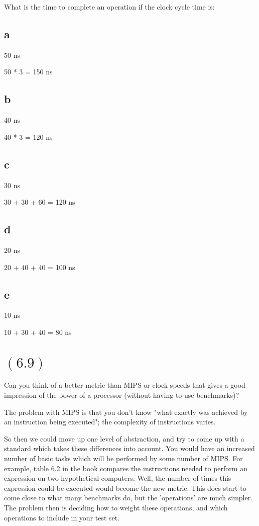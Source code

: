 \documentclass[letterpaper,12pt,titlepage]{article}
\begin{document}
What is the time to complete an operation if the clock cycle time is:

\begin{mdframed}[style=MyFrame]

\subsection*{a} 50 ns \newline

50 * 3 = 150 ns

\subsection*{b} 40 ns \newline

40 * 3 = 120 ns

\subsection*{c} 30 ns \newline

30 + 30 + 60 = 120 ns

\subsection*{d} 20 ns \newline

20 + 40 + 40 = 100 ns

\subsection*{e} 10 ns \newline

10 + 30 + 40 = 80 ns

\end{mdframed}
\newpage
\section*{$(6.9)$} Can you think of a better metric than MIPS or clock speeds that gives a good impression of the power of a processor (without having to use benchmarks)?
\begin{mdframed}[style=MyFrame]
    The problem with MIPS is that you don't know "what exactly was achieved by an instruction being executed";
    \cite{Clements} the complexity of instructions varies.

    So then we could move up one level of abstraction, and try to come up with a standard which takes these differences into account. You would have an increased number of basic tasks which will be performed by some number of MIPS. For example, table 6.2 in the book compares the instructions needed to perform an expression on two hypothetical computers. Well, the number of times this expression could be executed would become the new metric. This does start to come close to what many benchmarks do, but the 'operations' are much simpler. The problem then is deciding how to weight these operations, and which operations to include in your test set.
\end{mdframed}
\end{document}
